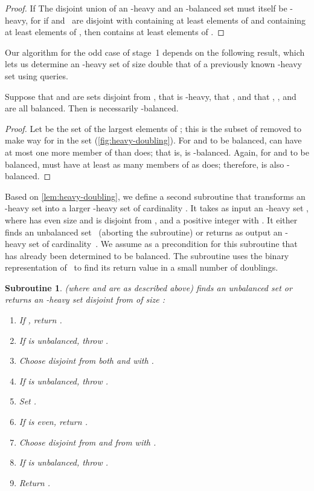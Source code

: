 \documentclass[11pt]{llncs}
\newtheorem{subroutine}{Subroutine}
\begin{document}
\begin{proof}
If
\else
The disjoint union of an -heavy and an -balanced set must itself be -heavy,
for if
\fi
 and~ are disjoint with  containing at least  elements of  and  containing at least  elements of , then  contains at least  elements of .
\ifFull
\end{proof}
\fi
Our algorithm for the odd case of stage~1 depends on the following result, which lets us determine an -heavy set of size double that of a previously known -heavy set using  queries.

\begin{lemma}
\label{lem:heavy-doubling}
Suppose that  and  are sets disjoint from , that  is -heavy, that , and that , , and  are all balanced. Then  is necessarily -balanced.
\end{lemma}

\begin{proof}
Let  be the set of the largest  elements of ; this is the subset of  removed to make way for  in the set  (\autoref{fig:heavy-doubling}). For  and  to be balanced,  can have at most one more member of  than  does; that is,  is -balanced. Again, for  and  to be balanced,  must have at least as many members of  as  does; therefore,  is also -balanced.
\end{proof}

Based on \autoref{lem:heavy-doubling}, we define a second subroutine  that transforms an -heavy set  into a larger -heavy set of cardinality . 
It takes as input an -heavy set , where  has even size and is disjoint from , and a positive integer  with . It either finds an unbalanced set~ (aborting the subroutine) or returns as output an -heavy set of cardinality~. We assume as a precondition for this subroutine that  has already been determined to be balanced. The subroutine uses the binary representation of~ to find its return value in a small number of doublings.
\begin{subroutine}  (where  and  are as described above) finds an unbalanced set or returns an -heavy set disjoint from  of size :
\begin{enumerate}
\item If , return .
\item If  is unbalanced, throw  .
\item Choose  disjoint from both  and  with .
\item If  is unbalanced, throw .
\item Set .
\item If  is even, return .
\item Choose  disjoint from  and from  with .
\item If  is unbalanced, throw .
\item Return .
\end{enumerate}
\end{subroutine}
\end{document}
